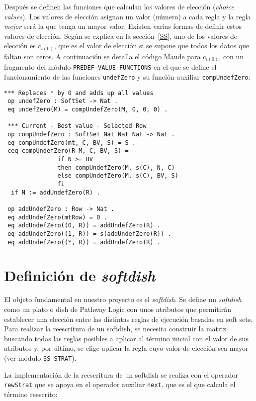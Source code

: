 Después se definen las funciones que calculan los valores de elección (\textit{choice values}).
Los valores de elección asignan un valor (número) a cada regla y la regla \textit{mejor} será la que tenga un mayor valor.
Existen varias formas de definir estos valores de elección. 
Según se explica en la sección~\ref{SS}, uno de los valores de elección es $c_{i(0)}$, que es el valor de elección si se supone que todos los datos que faltan son ceros.
A continuación se detalla el código Maude para $c_{i(0)}$, con un fragmento del módulo \texttt{PREDEF-VALUE-FUNCTIONS} en el que se define el funcionamiento de las funciones \texttt{undefZero} y su función auxiliar \texttt{compUndefZero}:

\begin{lstlisting}[language=Maude]
 *** Replaces * by 0 and adds up all values
 op undefZero : SoftSet -> Nat .
 eq undefZero(M) = compUndefZero(M, 0, 0, 0) .

 *** Current - Best value - Selected Row
 op compUndefZero : SoftSet Nat Nat Nat -> Nat .
 eq compUndefZero(mt, C, BV, S) = S .
 ceq compUndefZero(R M, C, BV, S) =
               if N >= BV
               then compUndefZero(M, s(C), N, C)
               else compUndefZero(M, s(C), BV, S)
               fi
  if N := addUndefZero(R) .

 op addUndefZero : Row -> Nat .
 eq addUndefZero(mtRow) = 0 .
 eq addUndefZero((0, R)) = addUndefZero(R) .
 eq addUndefZero((1, R)) = s(addUndefZero(R)) .
 eq addUndefZero((*, R)) = addUndefZero(R) .
\end{lstlisting}


\section{Definición de \textit{softdish}}

El objeto fundamental en nuestro proyecto es el \textit{softdish}. 
Se define un \textit{softdish} como un plato o dish de Pathway Logic con unos atributos que permitirán establecer una elección entre las distintas reglas de ejecución basadas en soft sets.
Para realizar la reescritura de un softdish, se necesita construir la matriz buscando todas las reglas posibles a aplicar al término inicial con el valor de sus atributos y,
por último, se elige aplicar la regla cuyo valor de elección sea mayor (ver módulo \texttt{SS-STRAT}).

La implementación de la reescritura de un softdish se realiza con el operador \texttt{rewStrat} que se apoya en el operador auxiliar \texttt{next}, que es el que calcula el término reescrito:

